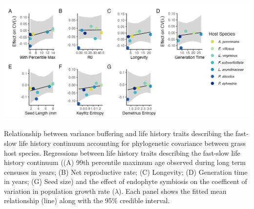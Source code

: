 \documentclass[lineno, sn-basic]{sn-jnl}%
\providecommand{\DIFaddbegin}{} %
\providecommand{\DIFaddend}{} %
\providecommand{\DIFdelend}{} %
\providecommand{\DIFaddbeginFL}{} %
\providecommand{\DIFaddendFL}{} %
\providecommand{\DIFdelbeginFL}{} %
\providecommand{\DIFdelendFL}{} %
\newcommand{\DIFscaledelfig}{0.5}
\newlength{\DIFdelgraphicswidth} %
\newlength{\DIFdelgraphicsheight} %
\newcommand{\DIFaddincludegraphics}[2][]{{\color{blue}\fbox{\DIFOincludegraphics[#1]{#2}}}} %
\newcommand{\DIFdelincludegraphics}[2][]{%
\sbox{\DIFdelgraphicsbox}{\DIFOincludegraphics[#1]{#2}}%
\settoboxwidth{\DIFdelgraphicswidth}{\DIFdelgraphicsbox} %
\settoboxtotalheight{\DIFdelgraphicsheight}{\DIFdelgraphicsbox} %
\scalebox{\DIFscaledelfig}{%
\parbox[b]{\DIFdelgraphicswidth}{\usebox{\DIFdelgraphicsbox}\\[-\baselineskip] \rule{\DIFdelgraphicswidth}{0em}}\llap{\resizebox{\DIFdelgraphicswidth}{\DIFdelgraphicsheight}{%
\setlength{\unitlength}{\DIFdelgraphicswidth}%
\begin{picture}(1,1)%
\thicklines\linethickness{2pt} %
{\color[rgb]{1,0,0}\put(0,0){\framebox(1,1){}}}%
{\color[rgb]{1,0,0}\put(0,0){\line( 1,1){1}}}%
{\color[rgb]{1,0,0}\put(0,1){\line(1,-1){1}}}%
\end{picture}%
}\hspace*{3pt}}} %
} %
\DeclareRobustCommand{\DIFaddbegin}{\DIFOaddbegin \let\includegraphics\DIFaddincludegraphics} %
\DeclareRobustCommand{\DIFaddend}{\DIFOaddend \let\includegraphics\DIFOincludegraphics} %
\DeclareRobustCommand{\DIFdelend}{\DIFOaddend \let\includegraphics\DIFOincludegraphics} %
\DeclareRobustCommand{\DIFaddbeginFL}{\DIFOaddbeginFL \let\includegraphics\DIFaddincludegraphics} %
\DeclareRobustCommand{\DIFaddendFL}{\DIFOaddendFL \let\includegraphics\DIFOincludegraphics} %
\DeclareRobustCommand{\DIFdelbeginFL}{\DIFOdelbeginFL \let\includegraphics\DIFdelincludegraphics} %
\DeclareRobustCommand{\DIFdelendFL}{\DIFOaddendFL \let\includegraphics\DIFOincludegraphics} %
\begin{document}
\begin{myfigure}[H]
\DIFdelendFL \includegraphics[width=\linewidth]{lh_plant_plot.png}
	\DIFdelbeginFL %
\DIFdelendFL \DIFaddbeginFL \caption[Relationship between variance buffering and life history traits describing the fast-slow life history continuum accounting for phylogenetic covariance between \emph{Epichlo\"{e}} symbionts]{\DIFaddendFL Relationship between variance buffering and life history traits describing the fast-slow life history continuum accounting for phylogenetic covariance between grass host species. Regressions between life history traits describing the fast-slow life history continuum ((A) 99th percentile maximum age observed during long term censuses in years; (B) Net reproductive rate; (C) Longevity; (D) Generation time in years; (G) Seed size) and the effect of endophyte symbiosis on the coefficent of variation in population growth rate ($\lambda$). Each panel shows the fitted mean relationship (line) along with the 95\% credible interval.}
\DIFdelbeginFL %
\DIFdelend \DIFaddbegin \end{myfigure}
\DIFaddend 
\end{document}
